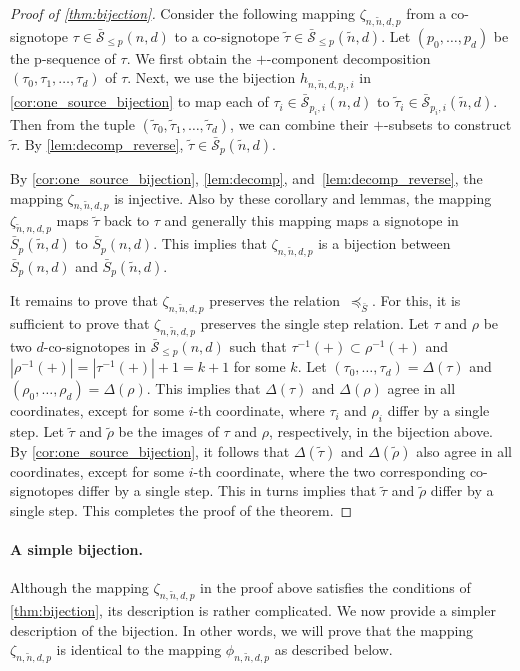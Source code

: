 \documentclass[a4paper,11pt]{amsart}
\newcommand{\calS}{\mathcal{S}}
\newcommand{\tn}{\tilde{n}}
\begin{document}
\begin{proof}[Proof of \cref{thm:bijection}]
    Consider the following mapping $\zeta_{n,\tn,d,p}$ from a co-signotope $\tau \in \bar{\calS}_{\leq p}(n,d)$ to a co-signotope $\tilde{\tau} \in \bar{\calS}_{\leq p}(\tn,d)$.
    Let $(p_0, \dots, p_d)$ be the p-sequence of $\tau$.
    We first obtain the $+$-component decomposition $(\tau_0,\tau_1,\dots,\tau_d)$ of $\tau$.
    Next, we use the bijection $h_{n,\tn,d,p_i,i}$ in \cref{cor:one_source_bijection} to map each of $\tau_i \in \bar{\calS}_{p_i,i}(n,d)$ to $\tilde{\tau}_i \in \bar{\calS}_{p_i,i}(\tn,d)$.
    Then from the tuple $(\tilde{\tau}_0,\tilde{\tau}_1,\dots,\tilde{\tau}_d)$, we can combine their $+$-subsets to construct $\tilde{\tau}$.
    By \cref{lem:decomp_reverse}, $\tilde{\tau} \in \bar{\calS}_{p}(\tn,d)$. 

    By \cref{cor:one_source_bijection}, \cref{lem:decomp}, and~\cref{lem:decomp_reverse}, the mapping $\zeta_{n,\tn,d,p}$ is injective.
    Also by these corollary and lemmas, the mapping $\zeta_{\tn,n,d,p}$ maps $\tilde{\tau}$ back to $\tau$ and generally this mapping maps a signotope in $\bar{S}_p(\tilde{n},d)$ to $\bar{S}_p(n,d)$.
    This implies that $\zeta_{n,\tn,d,p}$ is a bijection between $\bar{S}_p(n,d)$ and $\bar{S}_p(\tilde{n},d)$.

    It remains to prove that $\zeta_{n,\tn,d,p}$ preserves the relation~$\preceq_{\bar{S}}$.
    For this, it is sufficient to prove that $\zeta_{n,\tn,d,p}$ preserves the single step relation.
    Let $\tau$ and $\rho$ be two $d$-co-signotopes in $\bar{\calS}_{\leq p}(n,d)$ such that $\tau^{-1}(+) \subset \rho^{-1}(+)$ and $|\rho^{-1}(+)| = |\tau^{-1}(+)| + 1 = k+1$ for some $k$.
    Let $(\tau_0, \dots, \tau_d) = \Delta(\tau)$ and $(\rho_0, \dots, \rho_d) = \Delta(\rho)$.
    This implies that $\Delta(\tau)$ and $\Delta(\rho)$ agree in all coordinates, except for some $i$-th coordinate, where $\tau_i$ and $\rho_i$ differ by a single step.
    Let $\tilde{\tau}$ and $\tilde{\rho}$ be the images of $\tau$ and $\rho$, respectively, in the bijection above.
    By \cref{cor:one_source_bijection}, it follows that $\Delta(\tilde{\tau})$ and $\Delta(\tilde{\rho})$ also agree in all coordinates, except for some $i$-th coordinate, where the two corresponding co-signotopes differ by a single step.
    This in turns implies that $\tilde{\tau}$ and $\tilde{\rho}$ differ by a single step.
    This completes the proof of the theorem.
\end{proof}


\paragraph*{A simple bijection.}
Although the mapping $\zeta_{n,\tn,d,p}$ in the proof above satisfies the conditions of \cref{thm:bijection}, its description is rather complicated.
We now provide a simpler description of the bijection.
In other words, we will prove that the mapping $\zeta_{n,\tn,d,p}$ is identical to the mapping $\phi_{n,\tn,d,p}$ as described below.
\end{document}
